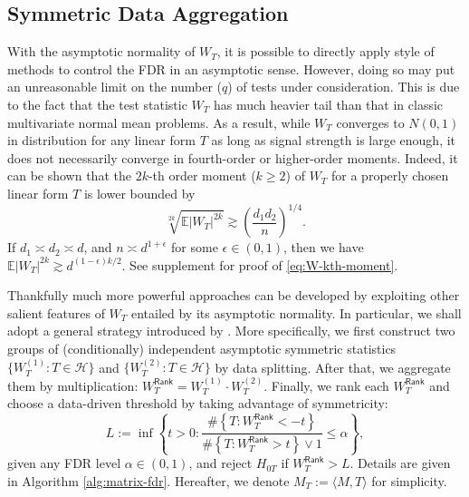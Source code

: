 \documentclass[12pt]{article}
\newcommand{\abs}[1]{\left\lvert#1\right\rvert}
\newcommand{\E}{\mathbb{E}}
\newcommand{\cH}{\mathcal{H}}
\theoremstyle{plain}
\begin{document}
\begin{sloppypar}
\subsection{Symmetric Data Aggregation}
With the asymptotic normality of $W_T$, it is possible to directly apply \cite{benjamini1995controlling} style of methods to control the FDR in an asymptotic sense. However, doing so may put an unreasonable limit on the number ($q$) of tests under consideration. This is due to the fact that the test statistic $W_T$ has much heavier tail than that in classic multivariate normal mean problems. As a result, while $W_T$ converges to $N(0,1)$ in distribution for any linear form $T$ as long as signal strength is large enough, it does not necessarily converge in fourth-order or higher-order moments. Indeed, it can be shown that the $2k$-th order moment ($k\ge 2$) of $W_T$ for a properly chosen linear form $T$ is lower bounded by
\begin{equation}\label{eq:W-kth-moment}
   \sqrt[2k]{ \E \abs{W_{T}}^{2k}} \gtrsim \left(\frac{d_1 d_2}{n}\right)^{1/4}.
\end{equation}
If $d_1\asymp d_2 \asymp d $, and $n \asymp d^{1+\epsilon }$ for some $\epsilon\in(0,1)$, then we have $\E \abs{W_{T}}^{2k} \gtrsim d^{(1-\epsilon)k/2}$. See supplement for proof of \eqref{eq:W-kth-moment}.

Thankfully much more powerful approaches can be developed by exploiting other salient features of $W_T$ entailed by its asymptotic normality. In particular, we shall adopt a general strategy introduced by \cite{du2021false}. More specifically, we first construct two groups of (conditionally) independent asymptotic symmetric statistics $\{W_{T}^{(1)}: T\in\cH\}$ and $\{W_{T}^{(2)}: T\in \cH\}$ by data splitting.  After that, we aggregate them by multiplication: $W_T^{\mathsf{Rank} }= W_T^{(1)} \cdot W_T^{(2)} $. Finally, we rank each $W_T^{\mathsf{Rank} }$ and choose a data-driven threshold by taking advantage of symmetricity:
\begin{equation}\label{eq:dd-threshold}
    L:=\inf \left\{t>0: \frac{\#\left\{T: W_T^{\mathsf{Rank} }<-t\right\}}{\#\left\{T: W_T^{\mathsf{Rank} }>t\right\} \vee 1} \leq \alpha\right\},
\end{equation}
given any FDR level $\alpha\in (0,1)$, and reject $H_{0T}$ if $W_T^{\mathsf{Rank}}>L$. Details are given in Algorithm \ref{alg:matrix-fdr}. Hereafter, we denote $M_T:=\langle M, T\rangle$ for simplicity. 


\end{sloppypar}
\end{document}
